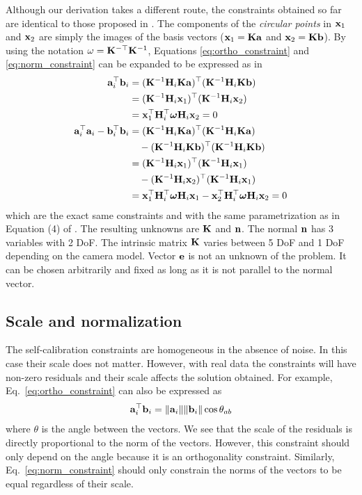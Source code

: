 \documentclass[10pt,twocolumn,letterpaper]{article}
\begin{document}
Although our derivation takes a different route, the constraints obtained so far are identical to those proposed in \cite{bocquillon2006}. The components of the \emph{circular points} in \cite{bocquillon2006} $\mathbf{x}_1$ and $\mathbf{x}_2$ are simply the images of the basis vectors (\ie $\mathbf{x}_1=\mathbf{K} \mathbf{a}$ and $\mathbf{x}_2=\mathbf{K} \mathbf{b}$). By using the notation $\omega=\mathbf{K}^{-\top}\mathbf{K}^{-1}$, Equations \eqref{eq:ortho_constraint} and \eqref{eq:norm_constraint} can be expanded to be expressed as in \cite{bocquillon2006}
%
\begin{align}
\mathbf{a}_i^\top \mathbf{b}_i &= (\mathbf{K}^{-1} \mathbf{H}_i \mathbf{K} \mathbf{a})^\top (\mathbf{K}^{-1} \mathbf{H}_i \mathbf{K} \mathbf{b}) \notag \\
&= (\mathbf{K}^{-1} \mathbf{H}_i \mathbf{x}_1)^\top (\mathbf{K}^{-1} \mathbf{H}_i \mathbf{x}_2) \notag \\
&= \mathbf{x}_1^\top \mathbf{H}_i^\top \bm{\omega} \mathbf{H}_i \mathbf{x}_2 = 0 
\\
\mathbf{a}_i^\top \mathbf{a}_i - \mathbf{b}_i^\top \mathbf{b}_i &= (\mathbf{K}^{-1} \mathbf{H}_i \mathbf{K} \mathbf{a})^\top (\mathbf{K}^{-1} \mathbf{H}_i \mathbf{K} \mathbf{a}) \notag 
\\
&\quad - (\mathbf{K}^{-1} \mathbf{H}_i \mathbf{K} \mathbf{b})^\top (\mathbf{K}^{-1} \mathbf{H}_i \mathbf{K} \mathbf{b}) \notag 
\\
&= (\mathbf{K}^{-1} \mathbf{H}_i \mathbf{x}_1)^\top (\mathbf{K}^{-1} \mathbf{H}_i \mathbf{x}_1) \notag 
\\
&\quad - (\mathbf{K}^{-1} \mathbf{H}_i \mathbf{x}_2)^\top (\mathbf{K}^{-1} \mathbf{H}_i \mathbf{x}_1) \notag 
\\
&= \mathbf{x}_1^\top \mathbf{H}_i^\top \bm{\omega} \mathbf{H}_i \mathbf{x}_1 - \mathbf{x}_2^\top \mathbf{H}_i^\top \bm{\omega} \mathbf{H}_i \mathbf{x}_2 = 0 
\end{align}
which are the exact same constraints and with the same parametrization as in Equation (4) of \cite{bocquillon2006}. The resulting unknowns are $\mathbf{K}$ and $\mathbf{n}$. The normal $\mathbf{n}$ has 3 variables with 2 DoF. The intrinsic matrix $\mathbf{K}$ varies between 5 DoF and 1 DoF depending on the camera model. Vector $\mathbf{e}$ is not an unknown of the problem. It can be chosen arbitrarily and fixed as long as it is not parallel to the normal vector.

\subsection{Scale and normalization}
\label{sec:calib:normalization}

The self-calibration constraints are homogeneous in the absence of noise. In this case their scale does not matter. However, with real data the constraints will have non-zero residuals and their scale affects the solution obtained. For example, Eq.~\eqref{eq:ortho_constraint} can also be expressed as
\begin{align}
\mathbf{a}_i^\top \mathbf{b}_i = \lVert\mathbf{a}_i\rVert \lVert\mathbf{b}_i\rVert \cos \theta_{a b}
\end{align} 
where $\theta$ is the angle between the vectors. We see that the scale of the residuals is directly proportional to the norm of the vectors. However, this constraint should only depend on the angle because it is an orthogonality constraint. Similarly, Eq.~\eqref{eq:norm_constraint} should only constrain the norms of the vectors to be equal regardless of their scale.
\end{document}

